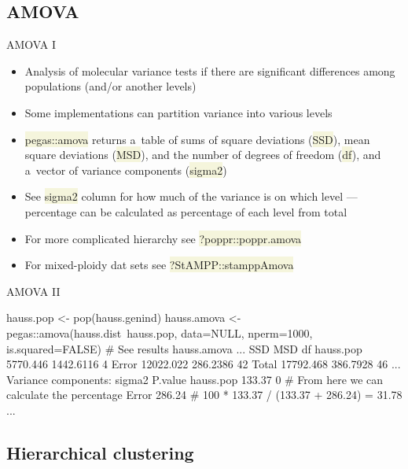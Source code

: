 \documentclass[compress, xelatex, 11pt, xcolor=svgnames, aspectratio=169,
	hyperref={
		bookmarks=true,
		unicode=true,
		colorlinks=true,
		pdftitle={Molecular data in R},
		plainpages=false,
		pdfauthor={Vojtech Zeisek},
		pdfsubject={Course about phylogeny and evolution in R},
		pdfcreator={XeLaTeX},
		pdfkeywords={R, evolution, phylogeny, molecular data},
		linkcolor=Crimson, %
		anchorcolor=Magenta, %
		citecolor=Magenta, %
		filecolor=Magenta, %
		menucolor=Magenta, %
		urlcolor=DodgerBlue, %
		},
	url={hyphens, lowtilde} %
	]{beamer}
\renewcommand{\texttt}[1]{\colorbox{Beige}{{\ttfamily #1}}}
\begin{document}
\subsection{AMOVA}

\begin{frame}{AMOVA I}
	\begin{itemize}
		\item Analysis of molecular variance tests if there are significant differences among populations (and/or another levels)
		\item Some implementations can partition variance into various levels
		\item \texttt{pegas::amova} returns a~table of sums of square deviations (\texttt{SSD}), mean square deviations (\texttt{MSD}), and the number of degrees of freedom (\texttt{df}), and a~vector of variance components (\texttt{sigma2})
		\item See \texttt{sigma2} column for how much of the variance is on which level --- percentage can be calculated as percentage of each level from total
		\item For more complicated hierarchy see \texttt{?poppr::poppr.amova}
		\item For mixed-ploidy dat sets see \texttt{?StAMPP::stamppAmova}
	\end{itemize}
\end{frame}

\begin{frame}[fragile]{AMOVA II}
	\begin{spluscode}
    hauss.pop <- pop(hauss.genind)
    hauss.amova <- pegas::amova(hauss.dist~hauss.pop, data=NULL,
      nperm=1000, is.squared=FALSE)
    # See results
    hauss.amova
    ...
                    SSD       MSD df
    hauss.pop  5770.446 1442.6116  4
    Error     12022.022  286.2386 42
    Total     17792.468  386.7928 46
    ...
    Variance components:
              sigma2 P.value
    hauss.pop 133.37       0 # From here we can calculate the percentage
    Error     286.24         # 100 * 133.37 / (133.37 + 286.24) = 31.78 %
    ...
	\end{spluscode}
\end{frame}

\subsection{Hierarchical clustering}
\end{document}
